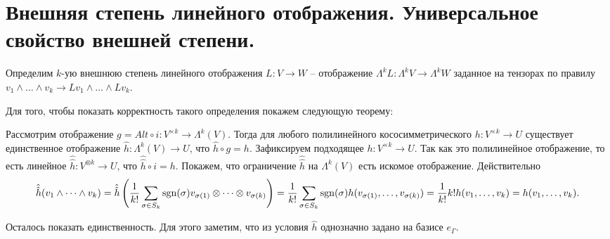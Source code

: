 \section{
 Внешняя степень линейного отображения. Универсальное свойство внешней степени.
}

\dfn Определим $k$-ую внешнюю степень линейного отображения $L\colon V \to W$ -- отображение $\Lambda^{k} L  \colon \Lambda^k V \to \Lambda^k W$ заданное на тензорах по правилу $v_1\wedge \dots \wedge v_k \to L v_1 \wedge \dots \wedge L v_k$. 
\edfn

Для того, чтобы показать корректность такого определения покажем следующую теорему:

\thrm Рассмотрим отображение $g=Alt \circ i \colon V^{\times k} \to \Lambda^k(V)$. Тогда для любого полилинейного кососимметрического $h \colon V^{\times k} \to U$ существует единственное отображение $\hat{h} \colon \Lambda^k(V) \to U$, что $\hat{h} \circ g = h$.
\proof Зафиксируем подходящее $h \colon V^{\times k} \to U$. Так как это полилинейное отображение, то есть линейное $\hat{\hat{h}}\colon V^{\otimes k} \to U$, что $\hat{\hat{h}} \circ i =h$. Покажем, что ограничение $\hat{\hat{h}}$ на $\Lambda^k(V)$ есть искомое отображение. Действительно $$\hat{\hat{h}}(v_1\wedge\dots\wedge v_k)=\hat{\hat{h}} \left(\frac{1}{k!} \sum_{\sigma \in S_k} \operatorname{sgn}(\sigma) v_{\sigma(1)}\otimes \dots \otimes v_{\sigma(k)} \right) =\frac{1}{k!} \sum_{\sigma \in S_k} \operatorname{sgn}(\sigma) h(v_{\sigma(1)},\dots,v_{\sigma(k)})=\frac{1}{k!}k!h(v_1,\dots,v_k)=h(v_1,\dots,v_k).$$

Осталось показать единственность. Для этого заметим, что из условия  $\hat{h}$ однозначно задано на базисе $e_{\Gamma}$.
\endproof
\ethrm
